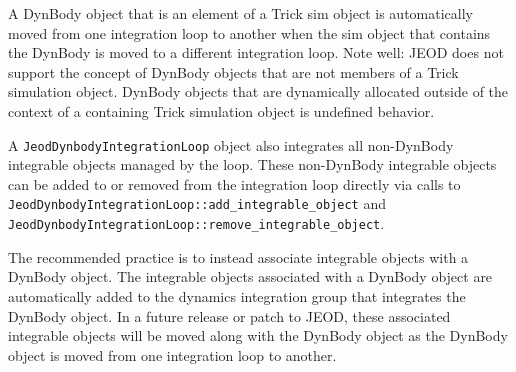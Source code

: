 A DynBody object that is an element of a Trick sim object is automatically moved
from one integration loop to another when the sim object that contains the
DynBody is moved to a different integration loop.
Note well: JEOD does not support the concept of DynBody objects that are not
members of a Trick simulation object. DynBody objects that are dynamically
allocated outside of the context of a containing Trick simulation object is
undefined behavior.

A \verb|JeodDynbodyIntegrationLoop| object also integrates all non-DynBody
integrable objects managed by the loop. These non-DynBody integrable objects
can be added to or removed from the integration loop directly via calls to
\verb|JeodDynbodyIntegrationLoop::add_integrable_object| and
\verb|JeodDynbodyIntegrationLoop::remove_integrable_object|.

The recommended practice is to instead associate integrable objects with
a DynBody object. The integrable objects associated with a DynBody object
are automatically added to the dynamics integration group that integrates
the DynBody object. In a future release or patch to JEOD, these associated
integrable objects will be moved along with the DynBody object as the
DynBody object is moved from one integration loop to another.

\clearpage
\boilerplateinventory
